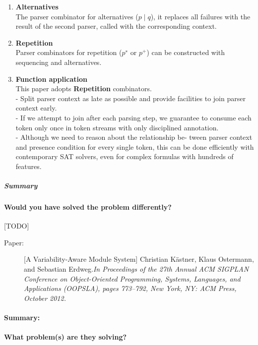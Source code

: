 \documentclass[12pt]{article}
\begin{document}
\begin{enumerate}
	\item \textbf{Alternatives}\\ The parser combinator for alternatives ($p\mid q$), it replaces all failures with the result of the second parser, called with the corresponding context.
	\item \textbf{Repetition}\\ Parser combinators for repetition ($p^{∗}$ or $p^{+}$) can be constructed with sequencing and alternatives.
	\item \textbf{Function application}\\ This paper adopts \textbf{Repetition} combinators.\\
		- Split parser context as late as possible and provide facilities to join parser context early.\\
		- If we attempt to join after each parsing step, we guarantee to consume each token only once in token streams with only disciplined annotation.\\
		- Although we need to reason about the relationship be- tween parser context and presence condition for every single token, this can be done efficiently with contemporary SAT solvers, even for complex formulas with hundreds of features. 
\end{enumerate}

\subparagraph{Summary}

\paragraph{Would you have solved the problem differently?}[TODO]


\clearpage
\begin{description}
\item[Paper:] [A Variability-Aware Module System] Christian Kästner, Klaus Ostermann, and Sebastian Erdweg.\emph{In Proceedings of the 27th Annual ACM SIGPLAN Conference on Object-Oriented Programming, Systems, Languages, and Applications (OOPSLA), pages 773--792, New York, NY: ACM Press, October 2012.} 
\end{description}

\paragraph{Summary:} 

\paragraph{What problem(s) are they solving?} 
\end{document}
